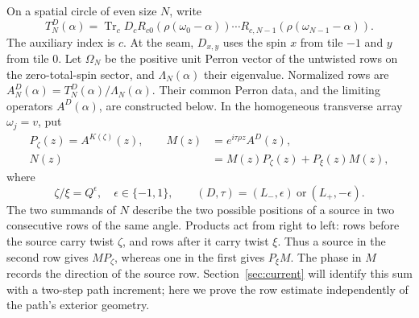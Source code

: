 On a spatial circle of even size $N$, write
\begin{equation}\label{bulk:finite-row}
 T_N^D(\alpha)=\operatorname{Tr}_c
 D_cR_{c0}(\rho(\omega_0-\alpha))\cdots
 R_{c,N-1}(\rho(\omega_{N-1}-\alpha)).
\end{equation}
The auxiliary index is $c$. At the seam, $D_{x,y}$ uses the spin $x$
from tile $-1$ and $y$ from tile $0$. Let $\Omega_N$ be the positive
unit Perron vector of the untwisted rows on the zero-total-spin
sector, and $\Lambda_N(\alpha)$ their eigenvalue. Normalized rows are
$A_N^D(\alpha)=T_N^D(\alpha)/\Lambda_N(\alpha)$.
Their common Perron data, and the limiting operators $A^D(\alpha)$,
are constructed below. In the homogeneous transverse array
$\omega_j=v$, put
\begin{equation}\label{bulk:MN}
 \begin{aligned}
 P_\zeta(z)=A^{K(\zeta)}(z),\qquad
 M(z)&=e^{i\tau\rho z}A^D(z),\\
 N(z)&=M(z)P_\zeta(z)+P_\xi(z)M(z),
 \end{aligned}
\end{equation}
where
\begin{equation}\label{bulk:charges}
 \zeta/\xi=Q^\epsilon,\quad \epsilon\in\{-1,1\},\qquad
 (D,\tau)=(L_-,\epsilon)\ \text{or}\ (L_+,-\epsilon).
\end{equation}
The two summands of $N$ describe the two possible positions of a
source in two consecutive rows of the same angle. Products act from
right to left: rows before the source carry twist $\zeta$, and rows
after it carry twist $\xi$. Thus a source in the second row gives
$MP_\zeta$, whereas one in the first gives $P_\xi M$. The phase in
$M$ records the direction of the source row. Section~\ref{sec:current}
will identify this sum with a two-step path increment; here we prove
the row estimate independently of the path's exterior geometry.


